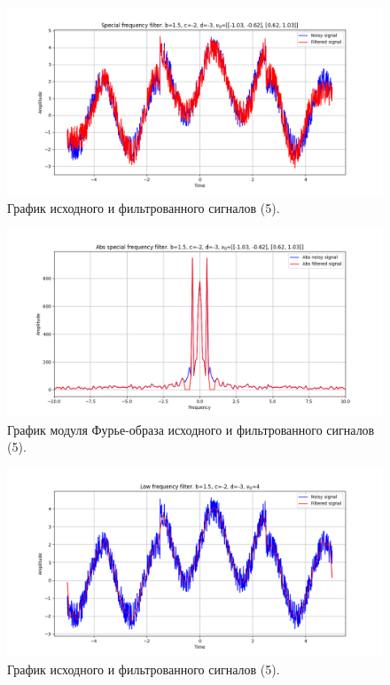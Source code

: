 \documentclass[a4paper, 12pt]{article}
\begin{document}
    \newpage
    \begin{figure}[!htb]
        \centering
        \includegraphics[scale=0.48]{5_u_flt_u_nospec.png}
        \captionsetup{skip=0pt}
        \caption{График исходного и фильтрованного сигналов (5).}
        \label{fig:fig01}
    \end{figure}
    \begin{figure}[!htb]
        \centering
        \includegraphics[scale=0.48]{5_abs_u_U_nospec.png}
        \captionsetup{skip=0pt}
        \caption{График модуля Фурье-образа исходного и фильтрованного сигналов (5).}
        \label{fig:fig02}
    \end{figure}
    \begin{figure}[H]
        \centering
        \includegraphics[scale=0.48]{5_1_u_flt_u_nospec.png}
        \captionsetup{skip=0pt}
        \caption{График исходного и фильтрованного сигналов (5).}
        \label{fig:fig03}
    \end{figure}
\end{document}

